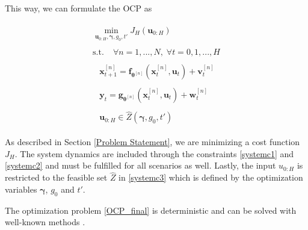 This way, we can formulate the OCP as

\begin{subequations}
\begin{align}
\begin{split}
\min\limits_{\boldsymbol{u}_{0:H},\boldsymbol{\gamma}, g_0, t' }  J_H(\boldsymbol{u}_{0:H})
\end{split}\\
\begin{split}
\text{s.t.}\; &\forall n = 1,...,N, \;  \forall t = 0,1,...,H
\end{split}\\
\begin{split}\label{systemc1}
&\boldsymbol{x}_{t+1}^{[n]} = \boldsymbol{f}_{\boldsymbol{\theta}^{[n]}} \left( \boldsymbol{x}_{t}^{[n]} , \boldsymbol{u}_t \right) + \boldsymbol{v}_{t}^{[n]}
\end{split}\\
\begin{split}\label{systemc2}
&\boldsymbol{y}_{t} = \boldsymbol{g}_{\boldsymbol{\theta}^{[n]}} \left( \boldsymbol{x}_{t}^{[n]}, \boldsymbol{u}_t \right) + \boldsymbol{w}_{t}^{[n]}
\end{split}\\
\begin{split}\label{systemc3}
 &\boldsymbol{u}_{0:H} \in \hat{Z}(\boldsymbol{\gamma}, g_0, t')
\end{split}
\end{align}
\label{OCP_final}
\end{subequations}

As described in Section \ref{Problem Statement}, we are minimizing a cost function $J_H$. The system dynamics are included through the constraints \eqref{systemc1} and \eqref{systemc2} and must be fulfilled for all scenarios as well. Lastly, the input $u_{0:H}$ is restricted to the feasible set $\hat{Z}$ in \eqref{systemc3} which is defined by the optimization variables $\boldsymbol{\gamma}$, $g_0$ and $t'$.

The optimization problem \eqref{OCP_final} is deterministic and can be solved with well-known methods \cite{Nocedal_06}.




